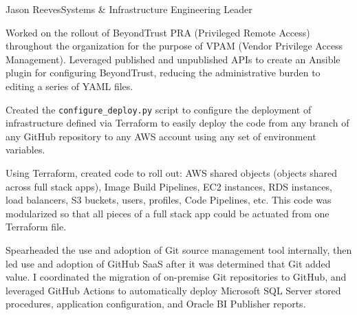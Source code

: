 \documentclass{article}
\begin{document}
\begin{cv}{Jason Reeves}{Systems \& Infrastructure Engineering Leader}
\begin{cvevent}[2022-2023]
    Worked on the rollout of BeyondTrust PRA (Privileged Remote Access) throughout the organization for the purpose of VPAM (Vendor Privilege Access Management).  Leveraged published and unpublished APIs to create an Ansible plugin for configuring BeyondTrust, reducing the administrative burden to editing a series of YAML files.
    \vspace*{5mm}
\end{cvevent}

\begin{cvevent}[2020-2021]
    Created the \texttt{configure\_deploy.py} script to configure the deployment of infrastructure defined via Terraform to easily deploy the code from any branch of any GitHub repository to any AWS account using any set of environment variables.
    \vspace*{5mm}
\end{cvevent}

\begin{cvevent}[2020-2021]
    Using Terraform, created code to roll out: AWS shared objects (objects shared across full stack apps), Image Build Pipelines, EC2 instances, RDS instances, load balancers, S3 buckets, users, profiles, Code Pipelines, etc.  This code was modularized so that all pieces of a full stack app could be actuated from one Terraform file.
    \vspace*{5mm}
\end{cvevent}

\begin{cvevent}[2019-2020]
    Spearheaded the use and adoption of Git source management tool internally, then led use and adoption of GitHub SaaS after it was determined that Git added value.  I coordinated the migration of on-premise Git repositories to GitHub, and leveraged GitHub Actions to automatically deploy Microsoft SQL Server stored procedures, application configuration, and Oracle BI Publisher reports.
    \vspace*{5mm}
\end{cvevent}


\end{cv}
\end{document}
